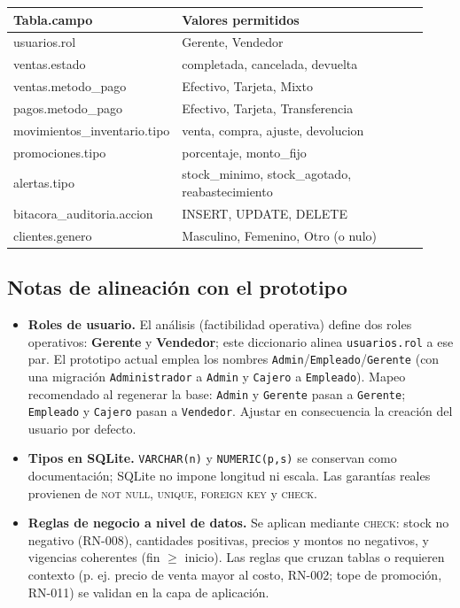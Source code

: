 \documentclass[11pt]{article}
\newcommand{\nn}{\textsc{not null}}
\newcommand{\uq}{\textsc{unique}}
\begin{document}
\begin{center}\footnotesize
\setlength{\LTpre}{0.3ex}
\begin{longtable}{@{}>{\ttfamily}p{0.27\linewidth} >{\raggedright\arraybackslash}p{0.66\linewidth}@{}}
\toprule
\normalfont\bfseries Tabla.campo & \normalfont\bfseries Valores permitidos \\ \midrule \endhead
usuarios.rol                 & Gerente, Vendedor \\
ventas.estado                & completada, cancelada, devuelta \\
ventas.metodo\_pago          & Efectivo, Tarjeta, Mixto \\
pagos.metodo\_pago           & Efectivo, Tarjeta, Transferencia \\
movimientos\_inventario.tipo & venta, compra, ajuste, devolucion \\
promociones.tipo             & porcentaje, monto\_fijo \\
alertas.tipo                 & stock\_minimo, stock\_agotado, reabastecimiento \\
bitacora\_auditoria.accion   & INSERT, UPDATE, DELETE \\
clientes.genero              & Masculino, Femenino, Otro (o nulo) \\
\bottomrule
\end{longtable}
\end{center}

\subsection{Notas de alineación con el prototipo}
\begin{itemize}[leftmargin=1.4em, itemsep=0.4ex]
  \item \textbf{Roles de usuario.} El análisis (factibilidad operativa) define
        dos roles operativos: \textbf{Gerente} y \textbf{Vendedor}; este
        diccionario alinea \texttt{usuarios.rol} a ese par. El prototipo actual
        emplea los nombres \texttt{Admin}/\texttt{Empleado}/\texttt{Gerente}
        (con una migración \texttt{Administrador} a \texttt{Admin} y
        \texttt{Cajero} a \texttt{Empleado}). Mapeo recomendado al regenerar la
        base: \texttt{Admin} y \texttt{Gerente} pasan a \texttt{Gerente};
        \texttt{Empleado} y \texttt{Cajero} pasan a \texttt{Vendedor}. Ajustar
        en consecuencia la creación del usuario por defecto.
  \item \textbf{Tipos en SQLite.} \texttt{VARCHAR(n)} y \texttt{NUMERIC(p,s)} se
        conservan como documentación; SQLite no impone longitud ni escala. Las
        garantías reales provienen de \nn, \uq, \textsc{foreign key} y
        \textsc{check}.
  \item \textbf{Reglas de negocio a nivel de datos.} Se aplican mediante
        \textsc{check}: stock no negativo (RN-008), cantidades positivas, precios
        y montos no negativos, y vigencias coherentes (fin $\geq$ inicio). Las
        reglas que cruzan tablas o requieren contexto (p. ej. precio de venta
        mayor al costo, RN-002; tope de promoción, RN-011) se validan en la capa
        de aplicación.
\end{itemize}
\end{document}
